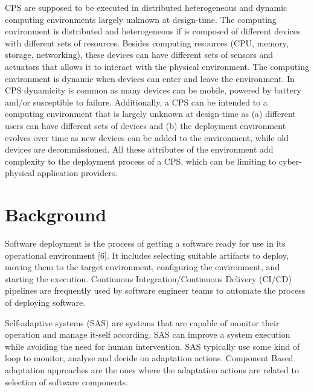 \documentclass[conference]{IEEEtran}
\begin{document}
CPS are supposed to be executed in distributed heterogeneous and dynamic computing environments largely unknown at design-time.  The computing environment is distributed and heterogeneous if is composed of different devices with different sets of resources. Besides computing resources (CPU, memory, storage, networking), these devices can have different sets of sensors and actuators that allows it to interact with the physical environment. The computing environment is dynamic when devices can enter and leave the environment. In CPS dynamicity is common as many devices can be mobile, powered by battery and/or susceptible to failure. Additionally, a CPS can be intended to a computing environment that is largely unknown at design-time as (a) different users can have different sets of devices and (b) the deployment environment evolves over time as new devices can be added to the environment, while old devices are decommissioned. All these attributes of the environment add complexity to the deployment process of a CPS, which can be limiting to cyber-physical application providers.

\section{Background}

Software deployment is the process of getting a software ready for use in its operational environment [6]. It includes selecting suitable artifacts to deploy, moving them to the target environment, configuring the environment, and starting the execution. Continuous Integration/Continuous Delivery (CI/CD) pipelines are frequently used by software engineer teams to automate the process of deploying software.

Self-adaptive systems (SAS) are systems that are capable of monitor their operation and manage it-self according. SAS can improve a system execution while avoiding the need for human intervention. SAS typically use some kind of loop to monitor, analyse and decide on adaptation actions. Component Based adaptation approaches are the ones where the adaptation actions are related to selection of software components. 
\end{document}
